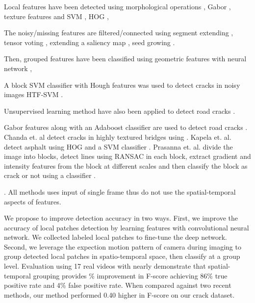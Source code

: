     Local features have been detected using morphological operations \cite{jahanshahi2013}, Gabor \cite{Medina2014}, 
     texture features and SVM \cite{chanda2014}, HOG \cite{Kapela2015}, 
    
    
      The noisy/missing features are filtered/connected using
    segment extending \cite{Liu2008}, tensor voting \cite{Zou2012}, extending a saliency map \cite{Xu2013}, seed growing \cite{Li2011}. 
    
    Then, grouped features have been classified using geometric features with neural network \cite{jahanshahi2013}, 
    
    
    A block SVM classifier with Hough features was used to detect cracks in noisy images HTF-SVM \cite{Hu2010}. 
    
    Unsupervised learning method have also been applied to detect road cracks \cite{Oliveira2014}. 
    
    
    Gabor features along with an Adaboost classifier are used to detect road cracks . Chanda et. al  detect cracks in highly textured bridges using . Kapela et. al. detect asphalt using HOG and a SVM classifier \cite{Kapela2015}. Prasanna et. al. divide the image into blocks, detect lines using RANSAC in each block, extract gradient and intensity features from the block at different scales and then classify the block as crack or not using a classifier \cite{Prasanna2014}. 
    
    
    
    
    
    
    
    .  All methods uses input of single frame thus do not use the spatial-temporal aspects of features.   
    
    
    We propose to improve detection accuracy in two ways.  First, we improve the accuracy of local patches detection by learning features with convolutional neural network.  We collected  labeled local patches to fine-tune the deep network.  Second, we leverage the expection motion pattern of camera during imaging to group detected local patches in spatio-temporal space, then classify at a group level.  Evaluation using 17 real videos with nearly  demonstrate that spatial-temporal grouping provides \% improvement in F-score achieving 86\% true positive rate and 4\% false positive rate.  When compared against two recent methods, our method performed 0.40 higher in F-score on our crack dataset.  
     

